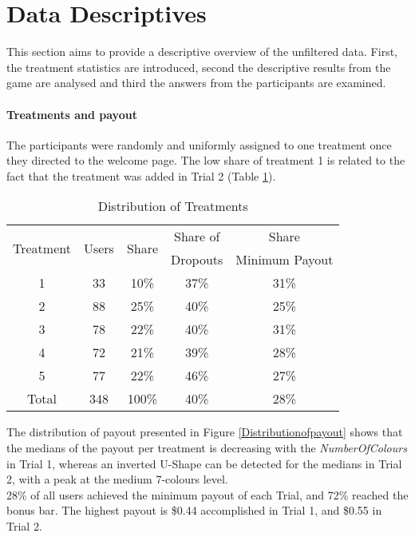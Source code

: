 \section{Data Descriptives}
\label{ch:Experiment:sec:DataacquisitionDescriptives:subsec:DescriptiveStatistics}

This section aims to provide a descriptive overview of the unfiltered data. First, the treatment statistics are introduced, second the descriptive results from the game are analysed and third the answers from the participants are examined.
\paragraph{Treatments and payout}
\label{ch:Evaluation:sec:DescriptiveStatistics:subsec:Distributionoftreatments}

The participants were randomly and uniformly assigned to one treatment once they directed to the welcome page. The low share of treatment 1 is related to the fact that the treatment was added in Trial 2 (Table \ref{Distributionoftreatments}).\\ 
\begin{table}[htbp] %
  \centering
  \caption{Distribution of Treatments}
    \label{Distributionoftreatments}
    \begin{tabular}{ccccc}
    \toprule
    \multirow{2}[1]{*}{Treatment} & \multirow{2}[1]{*}{Users} & \multirow{2}[1]{*}{Share} & Share of  & Share\\
    						   &						&  						 &	Dropouts\footnotemark & Minimum Payout\\
    \midrule
    1     & 33    & 10\%  & 37\% & 31\%\\
    2     & 88    & 25\%  & 40\% & 25\%\\
    3     & 78    & 22\%  & 40\% & 31\%\\
    4     & 72    & 21\%  & 39\% & 28\%\\
    5     & 77    & 22\%  & 46\% & 27\%\\
    
    \bottomrule
    Total & 348   & 100\% & 40\% & 28\%\\
    \end{tabular}%
\end{table}%

The distribution of payout presented in Figure \ref{Distributionofpayout} shows that the medians of the payout per treatment is decreasing with the \textit{NumberOfColours} in Trial 1, whereas an inverted U-Shape can be detected for the medians in Trial 2, with a peak at the medium 7-colours level.\\
28\% of all users achieved the minimum payout of each Trial, and 72\% reached the bonus bar. The highest payout is \$0.44 accomplished in Trial 1, and \$0.55 in Trial 2. 

